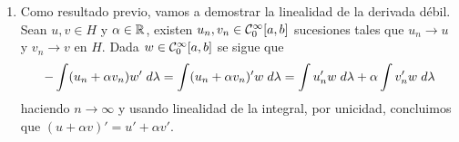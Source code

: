 \documentclass{article}
\begin{document}
\begin{enumerate}
    \item Como resultado previo, vamos a demostrar la linealidad de la derivada débil. Sean 
    $u,v\in H$ y $\alpha\in\mathbb{R}$, existen $u_{n},v_{n}\in\mathcal{C}_{0}^{\infty}[a,b]$ sucesiones tales que
    $u_{n}\to u$ y $v_{n}\to v$ en $H$. Dada $w\in\mathcal{C}_{0}^{\infty}[a,b]$ se sigue que
    \begin{equation*}
        -\int(u_{n}+\alpha v_{n})w'\hspace{1mm}d\lambda
        =\int(u_{n}+\alpha v_{n})'w\hspace{1mm}d\lambda
        =\int u_{n}'w\hspace{1mm}d\lambda+\alpha\int v_{n}'w\hspace{1mm}d\lambda
    \end{equation*}
    haciendo $n\to\infty$ y usando linealidad de la integral, por unicidad, concluimos que 
    $(u+\alpha v)'=u'+\alpha v'$.
    

\end{enumerate}
\end{document}
